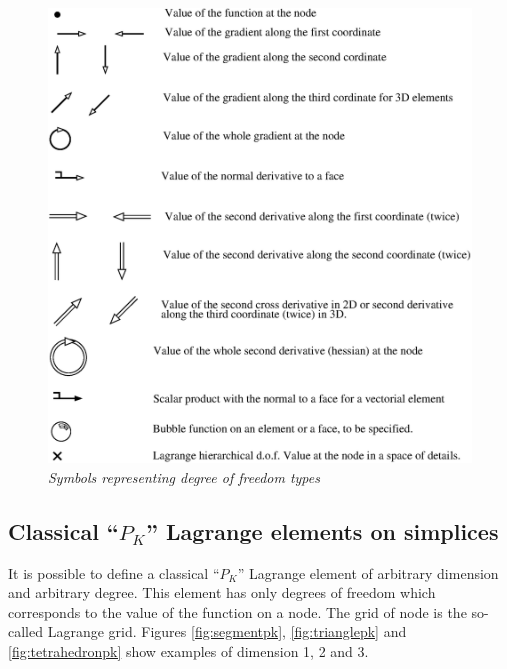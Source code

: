 \documentclass[11pt,a4paper]{article}
\begin{document}
\begin{figure}[H] \label{fig:symbols}
  \begin{center}
    \includegraphics[width=13cm,angle=0]{getfemlist_symbols.eps}
  \end{center}
  \caption{ \it Symbols representing degree of freedom types}
\end{figure}


\subsection{Classical ``$P_K$'' Lagrange elements on simplices}

It is possible to define a classical ``$P_K$'' Lagrange element of arbitrary dimension and arbitrary degree. This element has only degrees of freedom which corresponds to the value of the function on a node. The grid of node is the so-called Lagrange grid. Figures \ref{fig:segmentpk}, \ref{fig:trianglepk} and \ref{fig:tetrahedronpk} show examples of dimension 1, 2 and 3.
\end{document}
